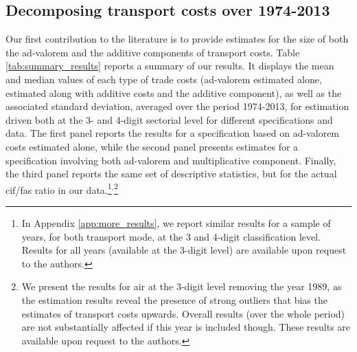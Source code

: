 \documentclass[a4paper,11pt]{article}
\begin{document}
\subsection{Decomposing transport costs over 1974-2013}

Our first contribution to the literature is to provide estimates for the size of both the ad-valorem and the additive components of transport costs. Table \ref{tab:summary_results} reports a summary of our results. It displays the mean and median values of each type of trade costs  (ad-valorem estimated alone, estimated along with additive costs and the additive component), as well as the associated standard deviation, averaged over the period 1974-2013, for estimation driven both at the 3- and 4-digit sectorial level for different specifications and data. The first panel reports the results for a specification based on ad-valorem costs estimated alone, while the second panel presents estimates for a specification involving both ad-valorem and multiplicative component. Finally, the third panel reports the same set of descriptive statistics, but for the actual cif/fas ratio in our data.\footnote{In Appendix \ref{app:more_results}, we report similar results for a sample of years, for both transport mode, at the 3 and 4-digit classification level. Results for all years (available at the 3-digit level) are available upon request to the authors.}$^{,}$\footnote{We present the results for air at the 3-digit level removing the year 1989, as the estimation results reveal the presence of strong outliers that bias the estimates of transport costs upwards. Overall results (over the whole period) are not substantially affected if this year is included though. These results are available upon request to the authors.}
\end{document}
